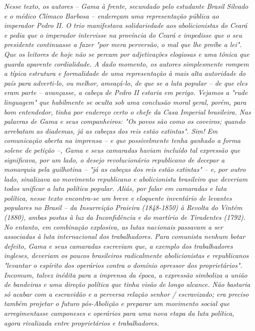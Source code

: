 \emph{Nesse texto, os autores -- Gama à frente, secundado pelo estudante
Brasil Silvado e o médico Clímaco Barbosa -- endereçam uma representação
pública ao imperador Pedro II. O trio manifestava solidariedade aos
abolicionistas do Ceará e pedia que o imperador intervisse na província
do Ceará e impedisse que o seu presidente continuasse a fazer "por mera
perversão, o mal que lhe proíbe a lei". Que os leitores de hoje não se
percam por adjetivações elogiosas e uma tônica que guarda aparente
cordialidade. A dado momento, os autores simplesmente rompem a típica
estrutura e formalidade de uma representação à mais alta autoridade do
país para adverti-lo, ou melhor, ameaçá-lo, de que se a luta popular --
de que eles eram parte -- avançasse, a cabeça de Pedro II estaria em
perigo. Vejamos a "rude linguagem" que habilmente se oculta sob uma
conclusão moral geral, porém, para bom entendedor, tinha por endereço
certo o chefe da Casa Imperial brasileira. Nas palavras de Gama e seus
companheiros: "Os povos são como os coveiros; quando arrebatam as
diademas, já as cabeças dos reis estão extintas". Sim! Em comunicação
aberta na imprensa -- e que possivelmente tenha ganhado a forma solene
de petição --, Gama e seus camaradas haviam incluído tal expressão que
significava, por um lado, o desejo revolucionário republicano de decepar
a monarquia pela guilhotina -- "já as cabeças dos reis estão extintas"
-- e, por outro lado, sinalizava ao movimento republicano e
abolicionista brasileiro que deveriam todos unificar a luta política
popular. Aliás, por falar em camaradas e luta política, nesse texto
encontra-se um breve e eloquente inventário de levantes populares no
Brasil -- da Insurreição Praieira (1848-1850) à Revolta do Vintém
(1880), ambas postas à luz da Inconfidência e do martírio de Tiradentes
(1792). No entanto, em combinação explosiva, as lutas nacionais passavam
a ser associadas à luta internacional dos trabalhadores. Para comunista
nenhum botar defeito, Gama e seus camaradas escreviam que, a exemplo dos
trabalhadores ingleses, deveriam os poucos brasileiros radicalmente
abolicionistas e republicanos "levantar o espírito dos operários contra
o domínio opressor dos proprietários". Incomum, talvez inédita para a
imprensa da época, a expressão simboliza a união de bandeiras e uma
direção política que tinha visão de longo alcance. Não bastaria só
acabar com a escravidão e a perversa relação senhor / escravizado; era
preciso também projetar o futuro pós-Abolição e preparar um movimento
social que arregimentasse camponeses e operários para uma nova etapa da
luta política, agora rivalizada entre proprietários e trabalhadores. }

